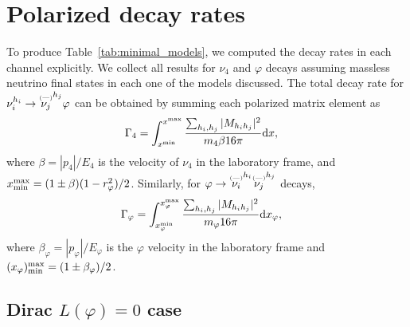 \documentclass[
reprint,
superscriptaddress,
showpacs,
preprintnumbers,
nofootinbib,
nobibnotes,
amsmath,
amssymb, 
aps,
prd,
floatfix
]{revtex4-1}
\newcommand{\reftab}[1]{Table~\ref{#1}}
\renewcommand{\phi}{\varphi}
\begin{document}
\section{Polarized decay rates}

To produce \reftab{tab:minimal_models}, we computed the decay rates in each channel explicitly. We collect all results for $\nu_4$ and $\phi$ decays assuming massless neutrino final states in each one of the models discussed. The total decay rate for $\nu_i^{h_i}\to\overset{\scriptscriptstyle(\text{\textemdash})}{\nu_j}^{h_j} \phi$ can be obtained by summing each polarized matrix element as
\begin{align}
    \Gamma_4 &= \int_{x^{\rm min}}^{x^{\rm max}} \frac{\sum_{h_i,h_j}|M_{h_i h_j}|^2}{m_4 \beta 16 \pi }\dd x,
\end{align}
where $\beta=|p_{4}|/E_{4}$ is the velocity of $\nu_4$ in the laboratory frame, and $x^{\rm max}_{\rm min} =  (1\pm\beta)(1-r_\phi^2)/2$. Similarly, for $\phi\to\overset{\scriptscriptstyle(\text{\textemdash})}{\nu_i}^{h_i}\overset{\scriptscriptstyle(\text{\textemdash})}{\nu_j}^{h_j}$ decays,
\begin{align}    
\Gamma_\phi &= \int_{x_\phi^{\rm min}}^{x_\phi^{\rm max}} \frac{\sum_{h_i,h_j}|M_{h_i h_j}|^2}{ m_\phi 16\pi} \dd x_\phi,
\end{align}    
where $\beta_\phi=|p_\phi|/E_\phi$ is the $\phi$ velocity in the laboratory frame and $(x_\phi)^{\rm max}_{\rm min} = (1\pm \beta_\phi)/2$. 


\subsection{Dirac $L(\phi)=0$ case}
\end{document}
